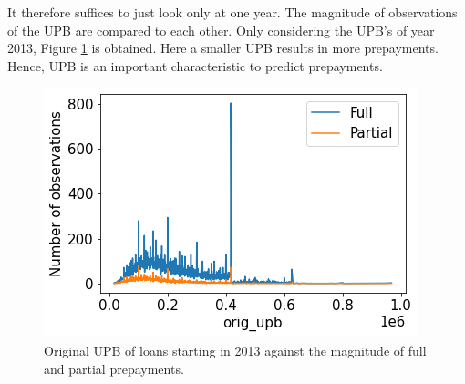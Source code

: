         It therefore suffices to just look only at one year. The 
        magnitude of observations of the UPB are compared to each
        other. Only considering the UPB's of year 2013, Figure 
        \ref{model_UPB_against_prepayment} is obtained. Here a
        smaller UPB results in more prepayments. Hence, UPB is an 
        important characteristic to predict prepayments. 
        \begin{figure}[H]
            \centering
            \includegraphics[width=0.6\linewidth]{Latex/Report/Figures/UPB againts Full and Partial prepayments.png}
            \caption{Original UPB of loans starting in 2013 against the magnitude of full and partial prepayments.}
            \label{model_UPB_against_prepayment}
        \end{figure}


